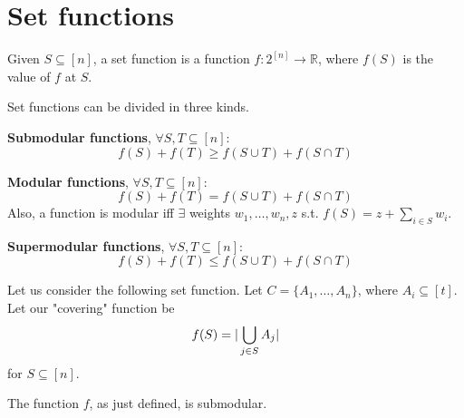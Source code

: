 \section{Set functions}
    Given $S \subseteq [n]$, a set function is a function $f : 2^{[n]} \rightarrow \mathbb{R}$, where $f(S)$ is the value of $f$ at $S$.

    Set functions can be divided in three kinds.

    \textbf{Submodular functions}, $\forall S,T \subseteq [n]$:
    \[ f(S) + f(T) \geq f(S \cup T) + f(S \cap T) \]

    \textbf{Modular functions}, $\forall S,T \subseteq [n]$:
    \[ f(S) + f(T) = f(S \cup T) + f(S \cap T) \]
    Also, a function is modular iff $\exists$ weights $w_1, \dots, w_n, z$ s.t. $f(S) = z + \sum_{i \in S} w_i$.

    \textbf{Supermodular functions}, $\forall S,T \subseteq [n]$:
    \[ f(S) + f(T) \leq f(S \cup T) + f(S \cap T) \]

    Let us consider the following set function.
    Let $C = \{ A_1, \dots, A_n \}$, where $A_i \subseteq [t]$.
    Let our "covering" function be
    \[ f(S) = \vert \bigcup_{j \in S} A_j \vert \]
    for $S \subseteq [n]$.

    \begin{theorem}
        The function $f$, as just defined, is submodular.
    \end{theorem}

